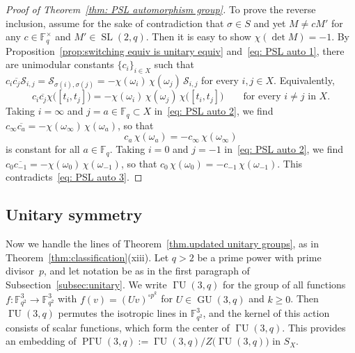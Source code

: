 \documentclass[11pt]{article}
\theoremstyle{definition}
\numberwithin{equation}{section}
\begin{document}
\begin{proof}[Proof of Theorem~\ref{thm: PSL automorphism group}]
To prove the reverse inclusion, assume for the sake of contradiction that $\sigma \in S$ and yet $M \neq c M'$ for any $c \in \mathbb{F}_q^\times$ and $M' \in \operatorname{SL}(2,q)$.
Then it is easy to show $\chi( \det M ) = -1$.
By Proposition~\ref{prop:switching equiv is unitary equiv} and~\eqref{eq: PSL auto 1}, there are unimodular constants $\{ c_i \}_{i\in X}$ such that
$c_i \overline{c_j} \mathcal{S}_{i,j} 
= \mathcal{S}_{\sigma(i), \sigma(j)}
= - \chi(\omega_i) \, \chi(\omega_j) \, \mathcal{S}_{i,j}$
for every $i,j \in X$.
Equivalently,
\begin{equation}
\label{eq: PSL auto 2}
c_i \overline{c_j} \chi\bigl( [t_i, t_j] \bigr)
= - \chi( \omega_i) \, \chi( \omega_j ) \, \chi\bigl( [t_i, t_j] \bigr)
\qquad
\text{for every $i \neq j$ in $X$}.
\end{equation}
Taking $i = \infty$ and $j = a\in \mathbb{F}_q \subset X$ in~\eqref{eq: PSL auto 2}, we find $c_\infty \overline{c_a} = - \chi( \omega_\infty)\, \chi( \omega_a )$, so that
\begin{equation}
\label{eq: PSL auto 3}
c_a\,  \chi( \omega_a) 
= -  c_\infty \, \chi( \omega_\infty)
\end{equation}
is constant for all $a \in \mathbb{F}_q$.
Taking $i = 0$ and $j = -1$ in~\eqref{eq: PSL auto 2}, we find $c_0 \overline{c_{-1}} = - \chi( \omega_0) \, \chi( \omega_{-1} )$, so that $c_0 \, \chi( \omega_0 )  = -  c_{-1} \, \chi( \omega_{-1} )$.
This contradicts~\eqref{eq: PSL auto 3}.
\end{proof}



\subsection{Unitary symmetry}

Now we handle the lines of Theorem~\ref{thm.updated unitary groups}, as in Theorem~\ref{thm:classification}(xiii).
Let $q>2$ be a prime power with prime divisor~$p$, and let notation be as in the first paragraph of Subsection~\ref{subsec:unitary}.
We write $\operatorname{\text{$\Gamma$}U}(3,q)$ for the group of all functions $f \colon \mathbb{F}_{q^2}^3 \to \mathbb{F}_{q^2}^3$ with $f(v) = (Uv)^{\circ p^k}$ for $U \in \operatorname{GU}(3,q)$ and $k \geq 0$.
Then $\operatorname{\text{$\Gamma$}U}(3,q)$ permutes the isotropic lines in $\mathbb{F}_{q^2}^3$, and the kernel of this action consists of scalar functions, which form the center of $\operatorname{\text{$\Gamma$}U}(3,q)$.
This provides an embedding of $\operatorname{P\text{$\Gamma$}U}(3,q) := \operatorname{\text{$\Gamma$}U}(3,q) / Z\bigl( \operatorname{\text{$\Gamma$}U}(3,q) \bigr)$ in $S_X$.
\end{document}
